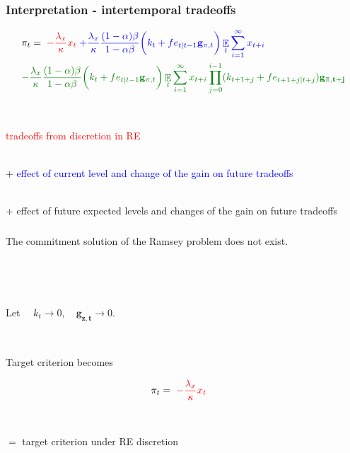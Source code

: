 \documentclass{beamer}
\DeclareMathOperator{\E}{\mathbb{E}}
\begin{document}
\begin{frame}
	\frametitle{Interpretation - intertemporal tradeoffs}

\begin{align*}
& \pi_t  =  \; \textcolor{red}{-\frac{\lambda_x}{\kappa} x_t} \textcolor{blue}{ \; + \frac{\lambda_x}{\kappa} \frac{(1-\alpha)\beta}{1-\alpha\beta} \bigg(k_t+ fe_{t|t-1}\mathbf{g}_{\pi,t} \bigg)\E_t\sum_{i=1}^{\infty}x_{t+i}}  \\
& \textcolor{mygreen}{- \frac{\lambda_x}{\kappa} \frac{(1-\alpha)\beta}{1-\alpha\beta} \bigg(k_t+ fe_{t|t-1}\mathbf{g}_{\pi,t} \bigg)\E_t\sum_{i=1}^{\infty}x_{t+i}\prod_{j=0}^{i-1}(k_{t+1+j}+ fe_{t+1+j|t+j})\mathbf{g_{\bar{\pi},t+j}} }
\end{align*}

\

\textcolor{red}{tradeoffs from discretion in RE} \\

\

+ \textcolor{blue}{effect of current level and change of the gain on future tradeoffs} \\

\

+ \textcolor{mygreen}{effect of future expected levels and changes of the gain on future tradeoffs}

\end{frame}

\begin{frame}
	\frametitle{}

\begin{lemma} The commitment solution of the Ramsey problem does not exist. 
\end{lemma}

\

\

Let $\quad k_t \rightarrow 0, \quad \mathbf{g_{z,t}} \rightarrow 0$. 

\

Target criterion becomes

\begin{align}
& \pi_t  =  \; \textcolor{red}{-\frac{\lambda_x}{\kappa} x_t} 
\end{align}

\

$=$ target criterion under RE discretion

\end{frame}
\end{document}
